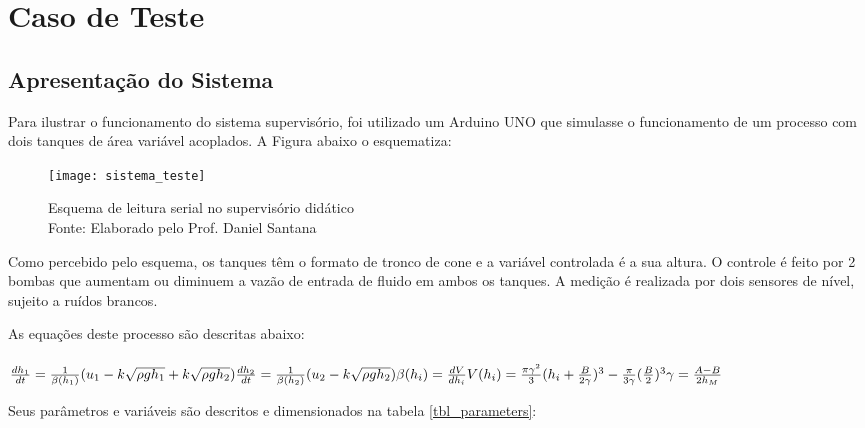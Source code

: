 \chapter{Caso de Teste}

\section{Apresentação do Sistema}

Para ilustrar o funcionamento do sistema supervisório, foi utilizado um Arduino UNO que simulasse o funcionamento de um processo com dois tanques de área variável acoplados. A Figura abaixo o esquematiza:

\begin{figure}[H]
	\centering
	\texttt{[image: sistema\_teste]}
	\caption{Esquema de leitura serial no supervisório didático\\Fonte: Elaborado pelo Prof. Daniel Santana}
	\label{img_sistema_teste}
\end{figure}

Como percebido pelo esquema, os tanques têm o formato de tronco de cone e a variável controlada é a sua altura. O controle é feito por 2 bombas que aumentam ou diminuem a vazão de entrada de fluido em ambos os tanques. A medição é realizada por dois sensores de nível, sujeito a ruídos brancos.

As equações deste processo são descritas abaixo:
\\\\
$
\frac{dh_1}{dt} = \frac{1}{\beta(h_1)}(u_1 - k\sqrt{\rho g h_1} + k\sqrt{\rho g h_2})\\
\frac{dh_2}{dt} = \frac{1}{\beta(h_2)}(u_2 - k\sqrt{\rho g h_2})\\
\beta(h_i) = \frac{dV}{dh_i}\\
V(h_i) = \frac{\pi\gamma^2}{3}(h_i + \frac{B}{2\gamma})^3 - \frac{\pi}{3\gamma}(\frac{B}{2})^3\\
\gamma = \frac{A-B}{2h_M}\\
$

Seus parâmetros e variáveis são descritos e dimensionados na tabela \ref{tbl_parameters}:


